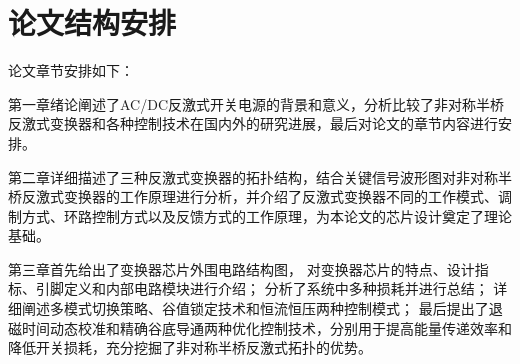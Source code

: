 




\section{论文结构安排}


论文章节安排如下： 

第一章绪论阐述了AC/DC反激式开关电源的背景和意义，分析比较了非对称半桥反激式变换器和各种控制技术在国内外的研究进展，最后对论文的章节内容进行安排。 

第二章详细描述了三种反激式变换器的拓扑结构，结合关键信号波形图对非对称半桥反激式变换器的工作原理进行分析，并介绍了反激式变换器不同的工作模式、调制方式、环路控制方式以及反馈方式的工作原理，为本论文的芯片设计奠定了理论基础。 

第三章首先给出了变换器芯片外围电路结构图，
对变换器芯片的特点、设计指标、引脚定义和内部电路模块进行介绍；
分析了系统中多种损耗并进行总结；
详细阐述多模式切换策略、谷值锁定技术和恒流恒压两种控制模式；
最后提出了退磁时间动态校准和精确谷底导通两种优化控制技术，分别用于提高能量传递效率和降低开关损耗，充分挖掘了非对称半桥反激式拓扑的优势。

